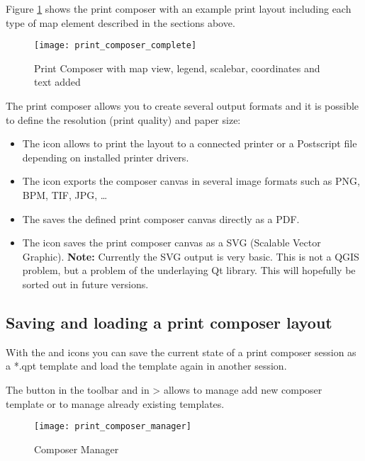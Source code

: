 Figure \ref{fig:print_composer_complete} shows the print composer with an example 
print layout including each type of map element described in the sections above.

\begin{figure}[h]
   \begin{center}
   \caption{Print Composer with map view, legend, scalebar, coordinates and text added \nixcaption}
   \label{fig:print_composer_complete}\smallskip
   \texttt{[image: print\_composer\_complete]}
\end{center}  
\end{figure}

The print composer allows you to create several output formats and it is possible to 
define the resolution (print quality) and paper size:

\begin{itemize}
\item The  icon allows to print the layout 
to a connected printer or a Postscript file depending on installed printer 
drivers.
\item The  icon exports the 
composer canvas in several image formats such as PNG, BPM, TIF, JPG, \dots
\item The  saves the defined
print composer canvas directly as a PDF.
\item The  icon saves the print 
composer canvas as a SVG (Scalable Vector Graphic). \textbf{Note:} Currently the 
SVG output is very basic. This is not a QGIS problem, but a problem of the underlaying 
Qt library. This will hopefully be sorted out in future versions.
\end{itemize}

\subsection{Saving and loading a print composer layout}

With the  and
 icons you can save the current
state of a print composer session as a  *.qpt template and load the template
again in another session.

The   button in the
toolbar and in  >
 allows to manage
add new composer template or to manage already existing templates. 

\begin{figure}[h]
   \begin{center}
   \caption{Composer Manager \nixcaption}
   \label{fig:print_composer_manager}\smallskip
   \texttt{[image: print\_composer\_manager]}
\end{center}
\end{figure}


